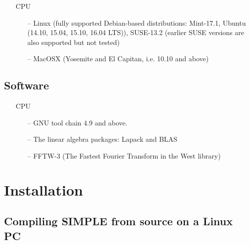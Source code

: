 \documentclass[a4paper,11pt]{article}
\begin{document}
\begin{itemize}
	\item [CPU]
	\begin{itemize}
		\item[--] Linux (fully supported Debian-based distributions: Mint-17.1, Ubuntu (14.10, 15.04, 15.10, 16.04 LTS)), SUSE-13.2 (earlier SUSE versions are also supported but not tested)
		\item[--] MacOSX (Yosemite and El Capitan, i.e. 10.10 and above)
	\end{itemize}
\end{itemize}

\subsection{Software}
\label{soft}

\begin{itemize}
	\item [CPU]
	\begin{itemize}
		\item[--] GNU tool chain 4.9 and above.
		\item[--] The linear algebra packages: Lapack and BLAS
		\item[--] FFTW-3 (The Fastest Fourier Transform in the West library)
	\end{itemize}
\end{itemize}

\section{Installation}
\label{install}

\subsection{Compiling SIMPLE from source on a Linux PC}
\label{compilepc}
\end{document}
